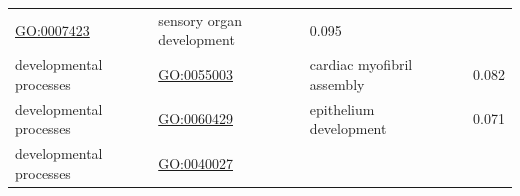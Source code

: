 \documentclass[
]{article}
\begin{document}
\begin{longtable}[]{@{}lllll@{}}
\begin{minipage}[t]{0.17\columnwidth}
\url{GO:0007423}\strut
\end{minipage} & \begin{minipage}[t]{0.17\columnwidth}\raggedright
sensory organ development\strut
\end{minipage} & \begin{minipage}[t]{0.17\columnwidth}\raggedright
0.095\strut
\end{minipage} & \begin{minipage}[t]{0.17\columnwidth}\raggedright
\strut
\end{minipage}\tabularnewline
\begin{minipage}[t]{0.17\columnwidth}\raggedright
developmental processes\strut
\end{minipage} & \begin{minipage}[t]{0.17\columnwidth}\raggedright
\url{GO:0055003}\strut
\end{minipage} & \begin{minipage}[t]{0.17\columnwidth}\raggedright
cardiac myofibril assembly\strut
\end{minipage} & \begin{minipage}[t]{0.17\columnwidth}\raggedright
\strut
\end{minipage} & \begin{minipage}[t]{0.17\columnwidth}\raggedright
0.082\strut
\end{minipage}\tabularnewline
\begin{minipage}[t]{0.17\columnwidth}\raggedright
developmental processes\strut
\end{minipage} & \begin{minipage}[t]{0.17\columnwidth}\raggedright
\url{GO:0060429}\strut
\end{minipage} & \begin{minipage}[t]{0.17\columnwidth}\raggedright
epithelium development\strut
\end{minipage} & \begin{minipage}[t]{0.17\columnwidth}\raggedright
\strut
\end{minipage} & \begin{minipage}[t]{0.17\columnwidth}\raggedright
0.071\strut
\end{minipage}\tabularnewline
\begin{minipage}[t]{0.17\columnwidth}\raggedright
developmental processes\strut
\end{minipage} & \begin{minipage}[t]{0.17\columnwidth}\raggedright
\url{GO:0040027}\strut
\end{minipage} & \begin{minipage}[t]{0.17\columnwidth}\raggedright

\end{minipage}
\end{longtable}
\end{document}

